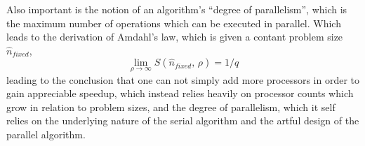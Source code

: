 Also important is the notion of an algorithm's ``degree of parallelism'', which is the maximum number of operations which can be executed in parallel. Which leads to the derivation of Amdahl's law, which is given a contant problem size $\hat{n}_{fixed}$,
%
\begin{equation}
	\lim_{\rho \to \infty} \mathit{S}(\hat{n}_{fixed},\,\rho) = 1 / q
\end{equation}
%
leading to the conclusion that one can not simply add more processors in order to gain appreciable speedup, which instead relies heavily on  processor counts which grow in relation to problem sizes, and the degree of parallelism, which it self relies on the underlying nature of the serial algorithm and the artful design of the parallel algorithm.





